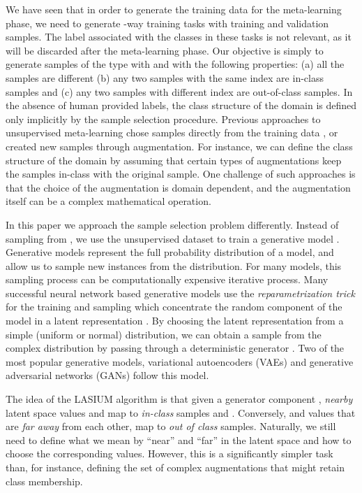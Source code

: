 \documentclass{article}
\begin{document}
We have seen that in order to generate the training data for the meta-learning phase, we need to generate -way training tasks with  training and  validation samples. The label associated with the classes in these tasks is not relevant, as it will be discarded after the meta-learning phase. Our objective is simply to generate samples of the type  with  and  with the following properties: (a) all the samples  are different (b) any two samples with the same  index are in-class samples and (c)  any two samples with different  index are out-of-class samples. In the absence of human provided labels, the class structure of the domain is defined only implicitly by the sample selection procedure. Previous approaches to unsupervised meta-learning chose samples directly from the training data , or created new samples through augmentation. For instance, we can define the class structure of the domain by assuming that certain types of augmentations keep the samples in-class with the original sample. One challenge of such approaches is that the choice of the augmentation is domain dependent, and the augmentation itself can be a complex mathematical operation. 

In this paper we approach the sample selection problem differently. Instead of sampling  from , we use the unsupervised dataset to train a generative model . Generative models represent the full probability distribution of a model, and allow us to sample new instances from the distribution. For many models, this sampling process can be computationally expensive iterative process. Many successful neural network based generative models use the {\em reparametrization trick} for the training and sampling which concentrate the random component of the model in a latent representation . By choosing the latent representation  from a simple (uniform or normal) distribution, we can obtain a sample from the complex distribution  by passing  through a deterministic generator . Two of the most popular generative models, variational autoencoders (VAEs) and generative adversarial networks (GANs) follow this model. 

The idea of the LASIUM algorithm is that given a generator component , {\em nearby} latent space values  and  map to {\em in-class} samples  and . Conversely,  and  values that are {\em far away} from each other, map to {\em out of class} samples. Naturally, we still need to define what we mean by ``near'' and ``far'' in the latent space and how to choose the corresponding  values. However, this is a significantly simpler task than, for instance, defining the set of complex augmentations that might retain class membership. 
 
\end{document}

